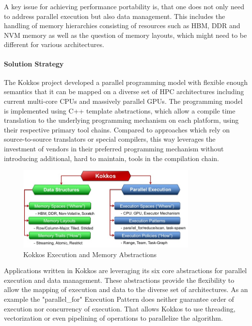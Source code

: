 A key issue for achieving performance portability is, that one does not only need to address parallel execution but also data management. 
This includes the handling of memory hierarchies consisting of resources such as HBM, DDR and NVM memory as well as the question of memory layouts, which might need to be different for various architectures. 

\paragraph{Solution Strategy}

The Kokkos project developed a parallel programming model with flexible enough semantics that it can be mapped on a diverse set of HPC architectures including current multi-core CPUs and massively parallel GPUs. 
The programming model is implemented using C++ template abstractions, which allow a compile time translation to the underlying programming mechanism on each platform, using their respective primary tool chains. 
Compared to approaches which rely on source-to-source translators or special compilers, this way leverages the investment of vendors in their preferred programming mechanism without introducing additional, hard to maintain, tools in the compilation chain. 

\begin{figure}[ht!]
\centering
\includegraphics[width=90mm]{projects/2.3.1-PMR/2.3.1.04-SNL-ATDM-PMR/kokkos-abstractions.jpg}
\caption{Kokkos Execution and Memory Abstractions}
\end{figure}

Applications written in Kokkos are leveraging its six core abstractions for parallel execution and data management. 
These abstractions provide the flexibility to allow the mapping of execution and data to the diverse set of architectures. 
As an example the "parallel\_for" Execution Pattern does neither guarantee order of execution nor concurrency of execution. 
That allows Kokkos to use threading, vectorization or even pipelining of operations to parallelize the algorithm. 

